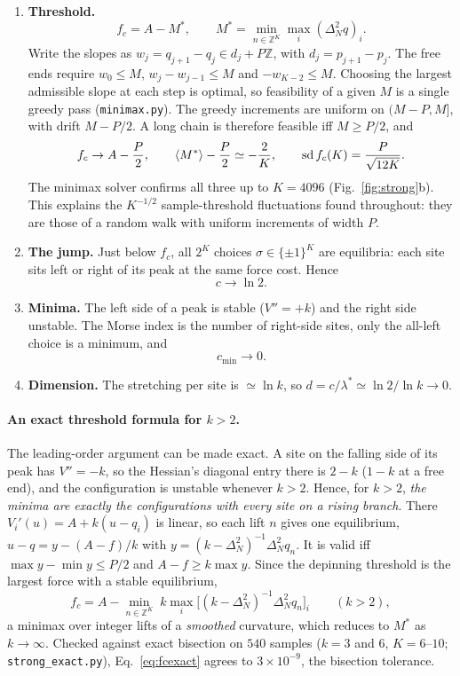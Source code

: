 \documentclass[10pt,a4paper]{article}
\begin{document}
\begin{enumerate}
\item \textbf{Threshold.}
\begin{equation}
f_c=A-M^*,\qquad M^*=\min_{n\in\mathbb Z^K}\max_i(\Delta_N^2q)_i .
\end{equation}
Write the slopes as $w_j=q_{j+1}-q_j\in d_j+P\mathbb Z$, with $d_j=p_{j+1}-p_j$. The free ends require $w_0\le M$, $w_j-w_{j-1}\le M$ and $-w_{K-2}\le M$. Choosing the largest admissible slope at each step is optimal, so feasibility of a given $M$ is a single greedy pass (\texttt{minimax.py}).
The greedy increments are uniform on $(M-P,M]$, with drift $M-P/2$. A long chain is therefore feasible iff $M\ge P/2$, and
\begin{equation}
f_c\to A-\frac P2,\qquad \langle M^*\rangle-\frac P2\simeq-\frac2K,\qquad {\rm sd}\,f_c(K)=\frac{P}{\sqrt{12K}} .
\end{equation}
The minimax solver confirms all three up to $K=4096$ (Fig.~\ref{fig:strong}b). This explains the $K^{-1/2}$ sample-threshold fluctuations found throughout: they are those of a random walk with uniform increments of width $P$.
\item \textbf{The jump.} Just below $f_c$, all $2^K$ choices $\sigma\in\{\pm1\}^K$ are equilibria: each site sits left or right of its peak at the same force cost. Hence
\[
c\to\ln2 .
\]
\item \textbf{Minima.} The left side of a peak is stable ($V''=+k$) and the right side unstable. The Morse index is the number of right-side sites, only the all-left choice is a minimum, and
\[
c_{\min}\to0 .
\]
\item \textbf{Dimension.} The stretching per site is $\simeq\ln k$, so $d=c/\lambda^*\simeq\ln2/\ln k\to0$.
\end{enumerate}

\paragraph{An exact threshold formula for $k>2$.}
The leading-order argument can be made exact.
A site on the falling side of its peak has $V''=-k$, so the Hessian's diagonal entry there is $2-k$ ($1-k$ at a free end), and the configuration is unstable whenever $k>2$.
Hence, for $k>2$, \emph{the minima are exactly the configurations with every site on a rising branch}.
There $V_i'(u)=A+k(u-q_i)$ is linear, so each lift $n$ gives one equilibrium, $u-q=y-(A-f)/k$ with $y=(k-\Delta_N^2)^{-1}\Delta_N^2q_n$.
It is valid iff $\max y-\min y\le P/2$ and $A-f\ge k\max y$.
Since the depinning threshold is the largest force with a stable equilibrium,
\begin{equation}
f_c=A-\min_{n\in\mathbb Z^K}\;k\max_i\big[(k-\Delta_N^2)^{-1}\Delta_N^2q_n\big]_i\qquad(k>2),
\label{eq:fcexact}
\end{equation}
a minimax over integer lifts of a \emph{smoothed} curvature, which reduces to $M^*$ as $k\to\infty$.
Checked against exact bisection on $540$ samples ($k=3$ and $6$, $K=6$--$10$; \texttt{strong\_exact.py}), Eq.~\eqref{eq:fcexact} agrees to $3\times10^{-9}$, the bisection tolerance.
\end{document}

